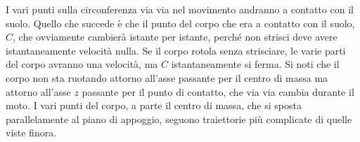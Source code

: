 \FloatBarrier
I vari punti sulla circonferenza via via nel movimento andranno a contatto con il suolo. Quello che succede è che il punto del corpo che era a contatto con il suolo, $C$, che ovviamente cambierà istante per istante, perché non strisci deve avere istantaneamente velocità nulla. Se il corpo rotola senza strisciare, le varie parti del corpo avranno una velocità, ma $C$ istantaneamente si ferma. Si noti che il corpo non sta ruotando attorno all'asse passante per il centro di massa ma attorno all'asse $z$ passante per il punto di contatto, che via via cambia durante il moto. I vari punti del corpo, a parte il centro di massa, che si sposta parallelamente al piano di appoggio, seguono traiettorie più complicate di quelle viste finora.

\begin{figure}[htpb]
	\centering

	 
	\tikzset{
	pattern size/.store in=\mcSize, 
	pattern size = 5pt,
	pattern thickness/.store in=\mcThickness, 
	pattern thickness = 0.3pt,
	pattern radius/.store in=\mcRadius, 
	pattern radius = 1pt}
	\makeatletter
	\makeatother

	\begin{tikzpicture}[x=0.75pt,y=0.75pt,yscale=-1,xscale=1]


\end{tikzpicture}
\end{figure}
